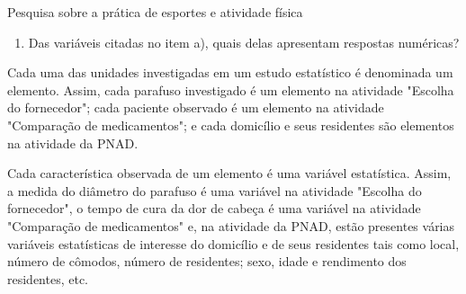\begin{task}{ Pesquisa sobre a prática de esportes e atividade física}
\begin{enumerate}
\item {} 
Das variáveis citadas no item a), quais delas apresentam respostas numéricas?

\end{enumerate}

Cada uma das unidades investigadas em um estudo estatístico é denominada um elemento.  Assim, cada parafuso investigado é um elemento na atividade "Escolha do fornecedor"; cada paciente observado é um elemento na atividade "Comparação de medicamentos"; e cada domicílio e seus residentes são elementos na atividade da PNAD.

Cada característica observada de um elemento é uma variável estatística. Assim, a medida do diâmetro do parafuso é uma variável na atividade "Escolha do fornecedor", o tempo de cura da dor de cabeça é uma variável na atividade "Comparação de medicamentos" e, na atividade da PNAD, estão presentes várias variáveis estatísticas de interesse do domicílio e de seus residentes tais como local, número de cômodos, número de residentes; sexo, idade e rendimento dos residentes, etc.
\end{task}

